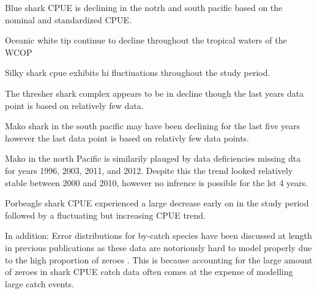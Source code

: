 Blue shark CPUE is declining in the notrh and south pacific based on the nominal and standardized CPUE.

Oceanic white tip continue to decline throughout the tropical waters of the WCOP

Silky shark cpue exhibits hi fluctiuations throughout the study period.


The thresher shark complex appears to be in decline though the last years data point is based on relatively few data.

Mako shark in the south pacific may have been declining for the last five years however the last data point is based on relativly few data points. 

Mako in the north Pacific is similarily plauged by data deficiencies missing dta for years 1996, 2003, 2011, and 2012. Despite this the trend looked relatively stable between 2000 and 2010, however no infrence is possible for the lst 4 years.

Porbeagle shark CPUE experienced a large decrease early on in the study period followed by a fluctuating but increasing CPUE trend.

 In addition: Error distributions for by-catch species have been discussed at length in previous publications as these data are notoriously hard to model properly due to the high proportion of zeroes \citep{...}. This is because accounting for the large amount of zeroes in shark CPUE catch data often comes at the expense of modelling large catch events.
 





%